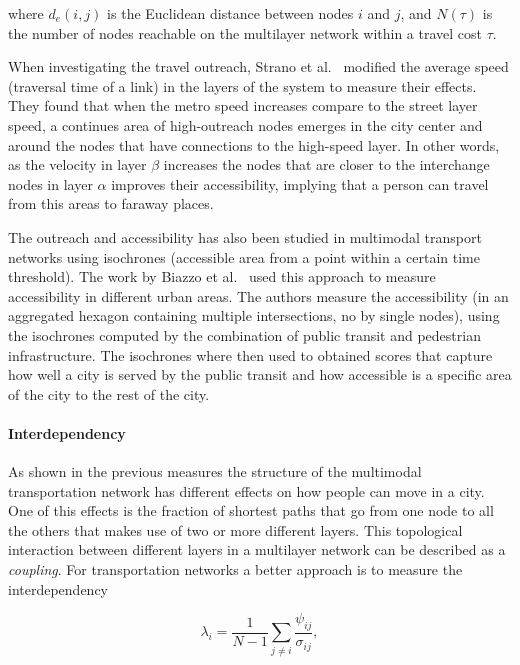 where $d_e(i,j)$ is the Euclidean distance between nodes $i$ and $j$, and $N(\tau)$ is the number of nodes reachable on the multilayer network within a travel cost $\tau$.

When investigating the travel outreach, Strano et al.~\cite{strano2015features} modified the average speed (traversal time of a link) in the layers of the system to measure their effects. They found that when the metro speed increases compare to the street layer speed, a continues area of high-outreach nodes emerges in the city center and around the nodes that have connections to the high-speed layer. In other words, as the velocity in layer $\beta$ increases the nodes that are closer to the interchange nodes in layer $\alpha$ improves their accessibility, implying that a person can travel from this areas to faraway places. 

The outreach and accessibility has also been studied in multimodal transport networks using isochrones (accessible area from a point within a certain time threshold). The work by Biazzo et al.~\cite{biazzo2019accesibility} used this approach to measure accessibility in different urban areas. The authors measure the accessibility (in an aggregated hexagon containing multiple intersections, no by single nodes), using the isochrones computed by the combination of public transit and pedestrian infrastructure. The isochrones where then used to obtained scores that capture how well a city is served by the public transit and how accessible is a specific area of the city to the rest of the city.

\paragraph*{Interdependency} \label{interdependence}
As shown in the previous measures the structure of the multimodal transportation network has different effects on how people can move in a city. One of this effects is the fraction of shortest paths that go from one node to all the others that makes use of two or more different layers. This topological interaction between different layers in a multilayer network can be described as a \textit{coupling}. For transportation networks a better approach is to measure the interdependency~\cite{morris2012transport,nicosia2013growing,strano2015features}

\begin{equation}
    \lambda_i=\frac{1}{N-1}\sum_{j\neq i}\frac{\psi_{ij}}{\sigma_{ij}},
    \label{eq:coupling}
\end{equation}

